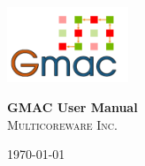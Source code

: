 \begin{titlingpage}

\begin{center}
\includegraphics[height=64pt]{logo}\\[1in]
\end{center}

\begin{flushright}
{\HUGE \bfseries GMAC User Manual}\\[0.5in]
\textsc{\Large Multicoreware Inc.}
\end{flushright}

\vfill
\begin{center}
{\large \today}
\end{center}

\end{titlingpage}
